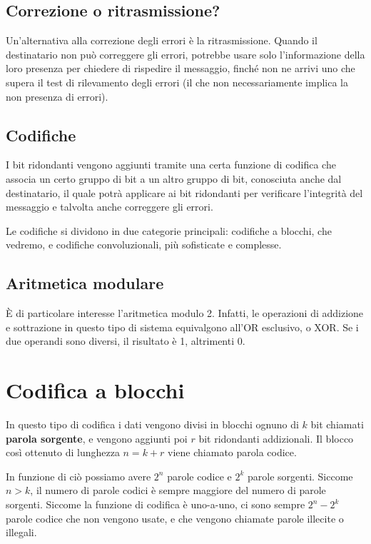     \subsection{Correzione o ritrasmissione?}
        Un'alternativa alla correzione degli errori è la ritrasmissione. Quando il destinatario non può correggere gli errori, potrebbe usare solo l'informazione della loro presenza per chiedere di rispedire il messaggio, finché non ne arrivi uno che supera il test di rilevamento degli errori (il che non necessariamente implica la non presenza di errori).
        
    \subsection{Codifiche}
        I bit ridondanti vengono aggiunti tramite una certa funzione di codifica che associa un certo gruppo di bit a un altro gruppo di bit, conosciuta anche dal destinatario, il quale potrà applicare ai bit ridondanti per verificare l'integrità del messaggio e talvolta anche correggere gli errori.
        
        Le codifiche si dividono in due categorie principali: codifiche a blocchi, che vedremo, e codifiche convoluzionali, più sofisticate e complesse.
        
    \subsection{Aritmetica modulare}
        È di particolare interesse l'aritmetica modulo 2. Infatti, le operazioni di addizione e sottrazione in questo tipo di sistema equivalgono all'OR esclusivo, o XOR. Se i due operandi sono diversi, il risultato è 1, altrimenti 0.
        
\section{Codifica a blocchi}
    In questo tipo di codifica i dati vengono divisi in blocchi ognuno di $k$ bit chiamati \textbf{parola sorgente}, e vengono aggiunti poi $r$ bit ridondanti addizionali. Il blocco così ottenuto di lunghezza $n = k + r$ viene chiamato parola codice.
    
    In funzione di ciò possiamo avere $2^n$ parole codice e $2^k$ parole sorgenti. Siccome $n > k$, il numero di parole codici è sempre maggiore del numero di parole sorgenti. Siccome la funzione di codifica è uno-a-uno, ci sono sempre $2^n - 2^k$ parole codice che non vengono usate, e che vengono chiamate parole illecite o illegali.
    
